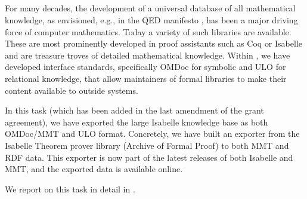 \subparagraph{}
For many decades, the development of a universal database of all mathematical knowledge, as envisioned, e.g., in the QED manifesto \cite{qed}, has been a major driving force of computer mathematics.
Today a variety of such libraries are available.
These are most prominently developed in proof assistants such as Coq \cite{coq} or Isabelle \cite{isabelle} and are treasure troves of detailed mathematical knowledge.
Within \pn, we have developed interface standards, specifically OMDoc for symbolic and ULO for relational knowledge, that allow maintainers of formal libraries to make their content available to outside systems.

In this task (which has been added in the last amendment of the grant agreement), we have exported the large Isabelle knowledge base as both OMDoc/MMT and ULO format.
Concretely, we have built an exporter from the Isabelle Theorem prover library (Archive of Formal Proof) to both MMT and RDF data.
This exporter is now part of the latest releases of both Isabelle and MMT, and the exported data is available online.

We report on this task in detail in .




